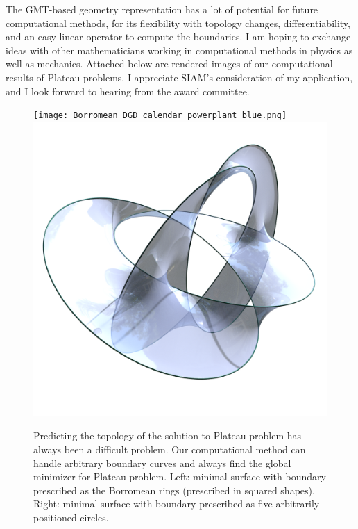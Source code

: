 \documentclass[12pt,a4paper]{article}
\begin{document}
The GMT-based geometry representation has a lot of potential for future computational methods, for its flexibility with topology changes, differentiability, and an easy linear operator to compute the boundaries.  
I am hoping to exchange ideas with other mathematicians working in computational methods in physics as well as mechanics.  
Attached below are rendered images of our computational results of Plateau problems. 
I appreciate SIAM's consideration of my application, and I look forward to hearing from the award committee. 
\begin{figure}[h]
  \centering
    \texttt{[image: Borromean\_DGD\_calendar\_powerplant\_blue.png]}
    \includegraphics[width=0.4\linewidth]{DGD_calendar_collage_rings_surface.png}
    \caption{
      Predicting the topology of the solution to Plateau problem has always been a difficult problem. Our computational method can handle arbitrary boundary curves and always find the global minimizer for Plateau problem. Left: minimal surface with boundary prescribed as the Borromean rings (prescribed in squared shapes). Right: minimal surface with boundary prescribed as five arbitrarily positioned circles. 
    }
  \end{figure}
\end{document}
